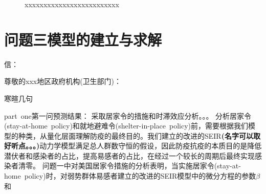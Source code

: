 \documentclass{whutmod}
\begin{document}
			\begin{figure}[H]	
				\centering
				\caption{xxxxxxxxxxxxxxxxxxxxxxxxx}
				\label{fisg}
			\end{figure}

    \section{问题三模型的建立与求解}
  		信：
  		
  		尊敬的xxx地区政府机构(卫生部门)：
  		
  		寒暄几句
  		
  		part\ one第一问预测结果：
  		采取居家令的措施和时滞效应分析。。。
  		分析居家令(stay-at-home\ policy)和就地避难令(shelter-in-place\ policy)前，需要根据我们模型的种类，从量化层面理解防疫的最终目的。我们建立的改进的SEIR\textbf{(名字可以取好听点。。。)}动力学模型满足总人群数守恒的假设，因此防疫抗疫的本质目的是降低潜伏者和感染者的占比，提高易感者的占比，在经过一个较长的周期后最终实现感染者清零。
  		问题一中对美国居家令措施的分析表明，当实施居家令(stay-at-home\ policy)时，对弱势群体易感者建立的改进的SEIR模型中的微分方程的参数$\beta$和
  		
\end{document}
